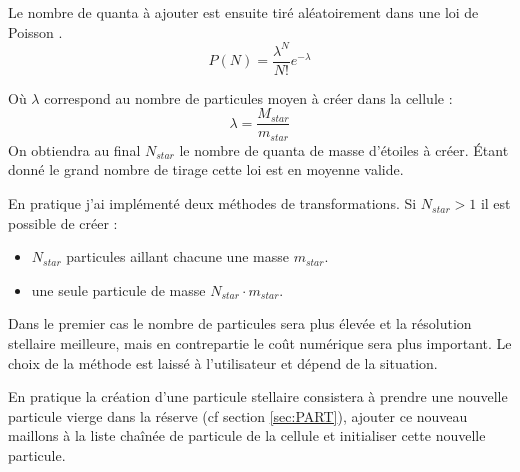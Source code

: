 Le nombre de quanta à ajouter est ensuite tiré aléatoirement dans une loi de Poisson \citep{rasera_history_2006}.
\begin{equation}
	P(N) = \frac{\lambda^N}{N!} e^{-\lambda}
\end{equation}

Où $\lambda$ correspond au nombre de particules moyen à créer dans la cellule :
\begin{equation}
\lambda = \frac{ M_{star}}{m_{star}}
\end{equation}
On obtiendra au final $N_{star}$ le nombre de quanta de masse d'étoiles à créer.
Étant donné le grand nombre de tirage cette loi est en moyenne valide.

En pratique j'ai implémenté deux méthodes de transformations.
Si  $N_{star}>1$ il est possible de créer : 
\begin{itemize}
\item  $N_{star}$ particules aillant chacune une masse  $m_{star}$.
\item une seule particule de masse  $N_{star} \cdot m_{star}$.
\end{itemize}

Dans le premier cas le nombre de particules sera plus élevée et la résolution stellaire meilleure, mais en contrepartie le coût numérique sera plus important.
Le choix de la méthode est laissé à l'utilisateur et dépend de la situation.


En pratique la création d'une particule stellaire consistera à prendre une nouvelle particule vierge dans la réserve (cf section \ref{sec:PART}), ajouter ce nouveau maillons à la liste chaînée de particule de la cellule et initialiser cette nouvelle particule.

